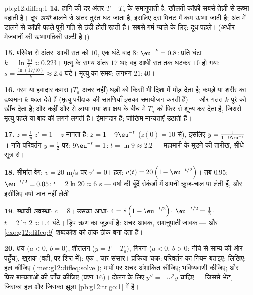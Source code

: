 \begin{solution}{pb:g12:diffeq:1}
\textbf{14.} हानि की दर अंतर $T - T_a$ के समानुपाती है: खौलती कॉफ़ी सबसे तेज़ी से
ऊष्मा बहाती है। दूध \emph{अभी} डालने से अंतर तुरंत घट जाता है, इसलिए दस मिनट
में कम ऊष्मा जाती है; अंत में डालने से कॉफ़ी पहले पूरी गति से ठंडी होती रहती
है। सबसे गर्म प्याले के लिए: दूध पहले। (अधीर मेज़बानों की ऊष्मागतिकी उल्टी
है।)

\textbf{15.} परिवेश से अंतर: आधी रात को $10$, एक घंटे बाद $8$: $\eu^{-k} = 0.8$: प्रति
घंटा $k = \ln\frac{10}{8} \approx 0.223$। मृत्यु के समय अंतर $17$ था; वह आधी रात तक घटकर $10$ हो गया:
$s = \frac{\ln(17/10)}{k} \approx 2.4$ घंटे। मृत्यु का समय: लगभग $21{:}40$।

\textbf{16.} गरम या हवादार कमरा ($T_a$ अचर नहीं) घड़ी को किसी भी दिशा में मोड़
देता है; कपड़े या शरीर का द्रव्यमान $k$ बदल देते हैं (मृत्यु-परीक्षक की
सारणियाँ इसका समायोजन करती हैं) --- और ग़लत $k$ पूरे  को खींच देता
है; और कहीं और से लाया गया शव क्षय के बीच में $T_a$ को फिर से शून्य कर देता
है, जिससे मृत्यु पहले या बाद की लगने लगती है।  ईमानदार है; जोखिम
मान्यताएँ उठाती हैं।

\textbf{17.} $z = \frac1y$ $z' = 1 - z$ मानता है: $z = 1 + 9\eu^{-t}$ ($z(0) = 10$ से), इसलिए $y = \frac{1}{1 + 9\eu^{-t}}$।
नति-परिवर्तन $y = \frac12$ पर: $9\eu^{-t} = 1$: $t = \ln 9 \approx 2.2$ --- महामारी के मुड़ने की तारीख़, सीधे
सूत्र से।

\textbf{18.} सीमांत वेग: $v = 20$ m/s पर $v' = 0$। हल: $v(t) = 20\left(1 - \eu^{-t/2}\right)$। तब $0.95$: $\eu^{-t/2} = 0.05$:
$t = 2\ln 20 \approx 6$ s --- वर्षा की बूँदें सेकंडों में अपनी क्रूज़-चाल पा लेती हैं, और इसीलिए
वर्षा जान नहीं लेती।

\textbf{19.} स्थायी अवस्था: $c = 8$। उसका आधा: $4 = 8\left(1 - \eu^{-t/2}\right)$: $\eu^{-t/2} = \frac12$: $t = 2\ln 2 \approx 1.4$ घंटे। ड्रिप
ऋण का  जुड़वाँ है: अचर आवक, समानुपाती जावक --- और \cref{exo:g12:diffeq:9} शब्दकोश को
ठीक-ठीक बना देता है।

\textbf{20.} क्षय ($a < 0$, $b = 0$), शीतलन ($y = T - T_a$), गिरना ($a < 0$, $b > 0$: नीचे से
साम्य की ओर पहुँच), ख़ुराक (वही, पर शिरा में): एक , चार संसार।
प्रक्रिया-चक्र: परिवर्तन का नियम बताइए;  लिखिए; हल कीजिए (\cref{met:g12:diffeq:solve}); मापों
पर अचर अंशांकित कीजिए; भविष्यवाणी कीजिए; और फिर मान्यताओं की जाँच कीजिए (प्रश्न
16)। दोलन के लिए $y'' = -\omega^2 y$ चाहिए --- जिससे भेंट, जिसका हल और जिसका झूला \cref{pb:g12:trigo:1} में
है।
\end{solution}
